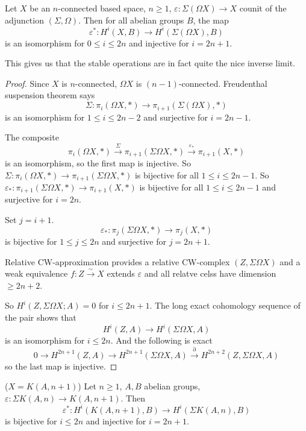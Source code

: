 \documentclass[language=english]{TemplateLecture}
\begin{document}
\begin{thm}{}{}
    Let \(X\) be an \(n\)-connected based space, \(n\geq 1\), \(\varepsilon\colon \Sigma(\Omega X)\to X\) counit of the adjunction \((\Sigma, \Omega)\). Then for all abelian groups \(B\), the map
    \[\varepsilon^*\colon H^i(X,B)\to H^i(\Sigma(\Omega X), B)\]
    is an isomorphism for \(0\leq i\leq 2n\) and injective for \(i = 2n+1\).
\end{thm}

This gives us that the stable operations are in fact quite the nice inverse limit.

\begin{proof}
    Since \(X\) is \(n\)-connected, \(\Omega X\) is \((n-1)\)-connected. Freudenthal suspension theorem says
    \[\Sigma\colon \pi_i(\Omega X, *) \to \pi_{i+1}(\Sigma (\Omega X), *)\]
    is an isomorphism for \(1\leq i \leq 2n-2\) and surjective for \(i = 2n-1\).
    
    The composite
    \[\pi_i(\Omega X, *) \xrightarrow{\Sigma} \pi_{i+1}(\Sigma \Omega X, *) \xrightarrow{\varepsilon_*} \pi_{i+1}(X,*)\]
    is an isomorphism, so the first map is injective. So \(\Sigma\colon \pi_{i}(\Omega X, *) \to \pi_{i+1}(\Sigma \Omega X, *)\) is bijective for all \(1\leq i \leq 2n-1\). So \(\varepsilon_*\colon \pi_{i+1}(\Sigma \Omega X, *) \to \pi_{i+1}(X,*)\) is bijective for all \(1\leq i\leq 2n-1\) and surjective for \(i = 2n\).

    Set \(j = i+1\).
    \[\varepsilon_*\colon \pi_j(\Sigma\Omega X, *) \to \pi_j(X,*)\]
    is bijective for \(1\leq j \leq 2n\) and surjective for \(j = 2n+1\).

    Relative CW-approximation provides a relative CW-complex \((Z, \Sigma\Omega X)\) and a weak equivalence \(f\colon Z\xrightarrow{\sim} X\) extends \(\varepsilon\) and all relatve celss have dimension \(\geq 2n+2\).

    So \(H^i(Z, \Sigma\Omega X; A) = 0\) for \(i\leq 2n+1\). The long exact cohomology sequence of the pair shows that
    \[H^i(Z,A)\to H^i(\Sigma\Omega X, A)\]
    is an isomorphism for \(i\leq 2n\). And the following is exact
    \[0 \to H^{2n+1}(Z,A) \to H^{2n+1} (\Sigma\Omega X, A) \xrightarrow{\partial} H^{2n+2}(Z, \Sigma\Omega X, A)\]
    so the last map is injective.
\end{proof}

\begin{corollary}
    (\(X = K(A,n+1)\)) Let \(n\geq 1\), \(A,B\) abelian groups, \(\varepsilon\colon \Sigma K(A,n)\to K(A,n+1)\). Then
    \[\varepsilon^*\colon H^i(K(A,n+1),B)\to H^i(\Sigma K(A,n),B)\]
    is bijective for \(i\leq 2n\) and injective for \(i = 2n+1\).
\end{corollary}
\end{document}

